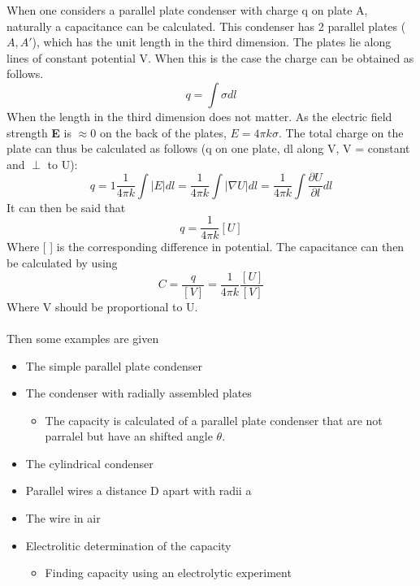 When one considers a parallel plate condenser with charge q on plate A, naturally a capacitance can be calculated.
This condenser has 2 parallel plates ($A,A'$), which has the unit length in the third dimension. The plates lie along lines of constant potential V.
When this is the case the charge can be obtained as follows.
\begin{equation}
    q=  \int \sigma dl
\end{equation}
When the length in the third dimension does not matter. As the electric field strength \textbf{E} is $\approx 0$ on the back of the plates, $\displaystyle E = 4\pi k \sigma$. The total charge on the plate can thus be calculated as follows (q on one plate, dl along V, V = constant and $\perp$ to U):
\begin{equation}
    q = 1\frac{1}{4\pi k }\int |E|dl = \frac{1}{4\pi k}\int|\nabla U|dl = \frac{1}{4\pi k}\int \frac{\partial U}{\partial l}dl
\end{equation}
It can then be said that 
\begin{equation}
    q = \frac{1}{4 \pi k} [U]
\end{equation}
Where [ ] is the corresponding difference in potential. The capacitance can then be calculated by using
\begin{equation}
    C = \frac{q}{[V]} = \frac{1}{4\pi k } \frac{[U]}{[V]}
\end{equation}
Where V should be proportional to U.\\
\\
\noindent Then some examples are given
\begin{itemize}
    \item The simple parallel plate condenser
    \item The condenser with radially assembled plates
    \begin{itemize}
        \item The capacity is calculated of a parallel plate condenser that are not parralel but have an shifted angle $\theta$.
    \end{itemize}
    \item The cylindrical condenser
    \item Parallel wires a distance D apart with radii a
    \item The wire in air 
    \item Electrolitic determination of the capacity
    \begin{itemize}
        \item Finding capacity using an electrolytic experiment
    \end{itemize}
\end{itemize}


